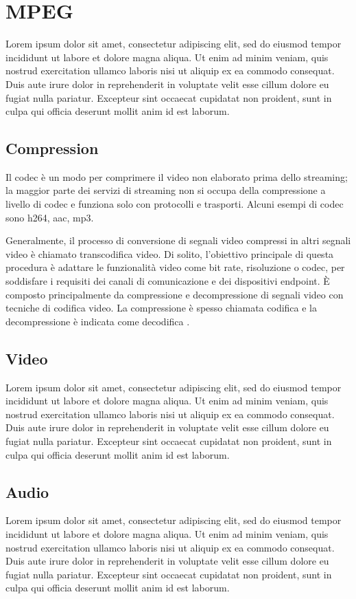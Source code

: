 \section{MPEG} \label{sec:cap3_MPEG}
Lorem ipsum dolor sit amet, consectetur adipiscing elit, sed do eiusmod tempor incididunt ut labore et dolore magna aliqua. Ut enim ad minim veniam, quis nostrud exercitation ullamco laboris nisi ut aliquip ex ea commodo consequat. Duis aute irure dolor in reprehenderit in voluptate velit esse cillum dolore eu fugiat nulla pariatur. Excepteur sint occaecat cupidatat non proident, sunt in culpa qui officia deserunt mollit anim id est laborum.

\subsection{Compression}
Il codec è un modo per comprimere il video non elaborato prima dello streaming; la maggior parte dei servizi di streaming non si occupa della compressione a livello di codec e funziona solo con protocolli e trasporti. Alcuni esempi di codec sono h264, aac, mp3.

Generalmente, il processo di conversione di segnali video compressi in altri segnali video è chiamato transcodifica video. Di solito, l'obiettivo principale di questa procedura è adattare le funzionalità video come bit rate, risoluzione o codec, per soddisfare i requisiti dei canali di comunicazione e dei dispositivi endpoint. È composto principalmente da compressione e decompressione di segnali video con tecniche di codifica video. La compressione è spesso chiamata codifica e la decompressione è indicata come decodifica \parencite{CombinedICTTechnologies}.

\subsection{Video}
Lorem ipsum dolor sit amet, consectetur adipiscing elit, sed do eiusmod tempor incididunt ut labore et dolore magna aliqua. Ut enim ad minim veniam, quis nostrud exercitation ullamco laboris nisi ut aliquip ex ea commodo consequat. Duis aute irure dolor in reprehenderit in voluptate velit esse cillum dolore eu fugiat nulla pariatur. Excepteur sint occaecat cupidatat non proident, sunt in culpa qui officia deserunt mollit anim id est laborum.

\subsection{Audio}
Lorem ipsum dolor sit amet, consectetur adipiscing elit, sed do eiusmod tempor incididunt ut labore et dolore magna aliqua. Ut enim ad minim veniam, quis nostrud exercitation ullamco laboris nisi ut aliquip ex ea commodo consequat. Duis aute irure dolor in reprehenderit in voluptate velit esse cillum dolore eu fugiat nulla pariatur. Excepteur sint occaecat cupidatat non proident, sunt in culpa qui officia deserunt mollit anim id est laborum.

